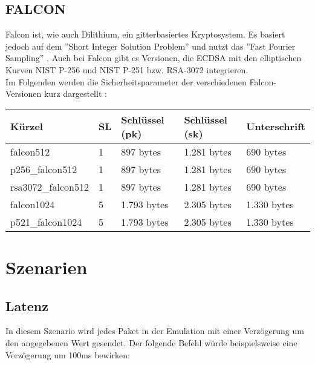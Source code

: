 		\subsection{FALCON}
		\label{subsec:methodik:alg:falcon}
		
		Falcon ist, wie auch Dilithium, ein gitterbasiertes Kryptosystem. Es basiert jedoch auf dem ''Short Integer Solution Problem'' 		und nutzt das ''Fast Fourier Sampling'' \cite{Falcon-HP}. Auch bei Falcon gibt es Versionen, die ECDSA mit den elliptischen 			Kurven NIST P-256 und NIST P-251 bzw. RSA-3072 integrieren.\\
		
		Im Folgenden werden die Sicherheitsparameter der verschiedenen Falcon-Versionen kurz dargestellt \cite{OQS-Falcon}:		
		
		\begin{center}
			\begin{tabular}{|l|l|l|l|l|}
				\hline	
				Kürzel 					& SL 	& Schlüssel (pk) 	& Schlüssel (sk) 	& Unterschrift 	\\
				\hline
				falcon512 				& 1		& 897 bytes			& 1.281 bytes		& 690 bytes		\\
				p256\_falcon512 			& 1		& 897 bytes			& 1.281 bytes		& 690 bytes		\\
				rsa3072\_falcon512 		& 1		& 897 bytes			& 1.281 bytes		& 690 bytes		\\
				\hline
				falcon1024 				& 5 		& 1.793 bytes		& 2.305 bytes		& 1.330 bytes	\\
				p521\_falcon1024 		& 5		& 1.793 bytes		& 2.305 bytes		& 1.330 bytes	\\
				\hline
			\end{tabular}
		\end{center}
		
	\section{Szenarien}
	\label{sec:methodik:szenarien}
	
		\subsection{Latenz}
		\label{subsec:methodik:szenarien:latenz}
		
		In diesem Szenario wird jedes Paket in der Emulation mit einer Verzögerung um den angegebenen Wert gesendet. Der folgende 				Befehl würde beispielsweise eine Verzögerung um 100ms bewirken:\\
		
